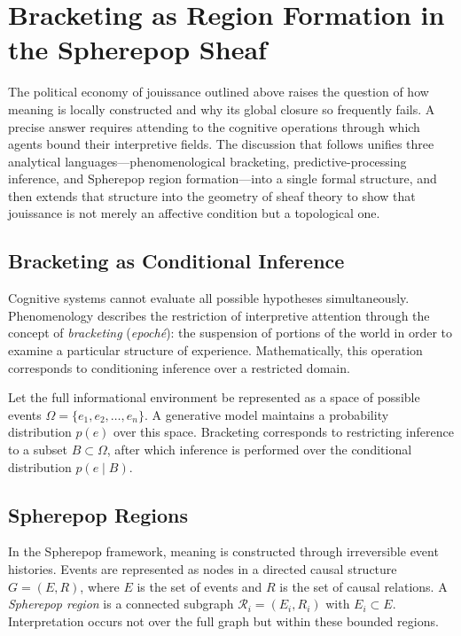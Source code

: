 \documentclass[12pt,a4paper]{article}
\begin{document}
\section{Bracketing as Region Formation in the Spherepop Sheaf}

The political economy of jouissance outlined above raises the question of how meaning is
locally constructed and why its global closure so frequently fails. A precise answer requires
attending to the cognitive operations through which agents bound their interpretive fields.
The discussion that follows unifies three analytical languages---phenomenological bracketing,
predictive-processing inference, and Spherepop region formation---into a single formal
structure, and then extends that structure into the geometry of sheaf theory to show that
jouissance is not merely an affective condition but a topological one.

\subsection*{Bracketing as Conditional Inference}

Cognitive systems cannot evaluate all possible hypotheses simultaneously. Phenomenology
describes the restriction of interpretive attention through the concept of \emph{bracketing}
(\emph{epoch\'{e}}): the suspension of portions of the world in order to examine a particular
structure of experience. Mathematically, this operation corresponds to conditioning inference
over a restricted domain.

Let the full informational environment be represented as a space of possible events
$\Omega = \{e_1, e_2, \dots, e_n\}$. A generative model maintains a probability distribution
$p(e)$ over this space. Bracketing corresponds to restricting inference to a subset
$B \subset \Omega$, after which inference is performed over the conditional distribution
$p(e \mid B)$.

\subsection*{Spherepop Regions}

In the Spherepop framework, meaning is constructed through irreversible event histories.
Events are represented as nodes in a directed causal structure $G = (E, R)$, where $E$ is
the set of events and $R$ is the set of causal relations. A \emph{Spherepop region} is a
connected subgraph $\mathcal{R}_i = (E_i, R_i)$ with $E_i \subset E$. Interpretation occurs
not over the full graph but within these bounded regions.
\end{document}

